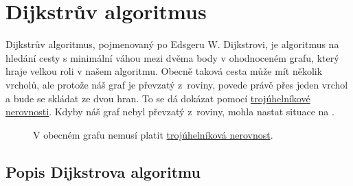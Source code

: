 \section{Dijkstrův algoritmus}
\label{sec:dijkstra}

Dijkstrův algoritmus, pojmenovaný po Edsgeru W. Dijkstrovi, je algoritmus na hledání cesty s minimální váhou mezi dvěma body v ohodnoceném grafu, který hraje velkou roli v našem algoritmu. Obecně taková cesta může mít několik vrcholů, ale protože náš graf je převzatý z~roviny, povede právě přes jeden vrchol a bude se skládat ze dvou hran. To se dá dokázat pomocí \hyperref[definice:trojuhelnikova_nerovnost]{trojúhelníkové nerovnosti}. Kdyby náš graf nebyl převzatý z~roviny, mohla nastat situace na .

\begin{figure}[H]

    \centering
    \caption{V obecném grafu nemusí platit \hyperref[definice:trojuhelnikova_nerovnost]{trojúhelníková nerovnost}.}
    \label{obr:troj_ner_graf}
\end{figure}

\subsection{Popis Dijkstrova algoritmu}
\label{subsec:popis-algoritmu}

